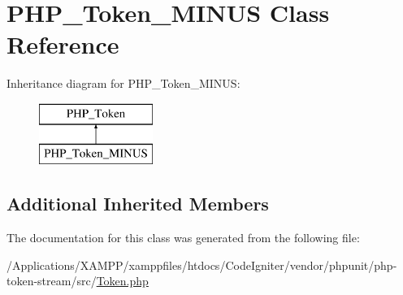 \hypertarget{class_p_h_p___token___m_i_n_u_s}{}\section{P\+H\+P\+\_\+\+Token\+\_\+\+M\+I\+N\+US Class Reference}
\label{class_p_h_p___token___m_i_n_u_s}
Inheritance diagram for P\+H\+P\+\_\+\+Token\+\_\+\+M\+I\+N\+US\+:\begin{figure}[H]
\begin{center}
\leavevmode
\includegraphics[height=2.000000cm]{class_p_h_p___token___m_i_n_u_s}
\end{center}
\end{figure}
\subsection*{Additional Inherited Members}


The documentation for this class was generated from the following file\+:\begin{DoxyCompactItemize}
\item 
/\+Applications/\+X\+A\+M\+P\+P/xamppfiles/htdocs/\+Code\+Igniter/vendor/phpunit/php-\/token-\/stream/src/\mbox{\hyperlink{_token_8php}{Token.\+php}}\end{DoxyCompactItemize}
